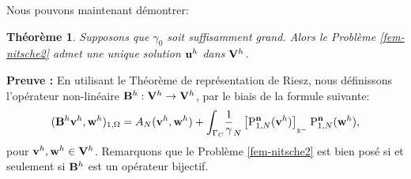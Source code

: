 \documentclass[11pt]{book}
\newtheorem{theorem}{Théorème}[section]
\newcommand{\bt}{\begin{theorem}}
\newcommand{\et}{\end{theorem}}
\newcommand{\pf}{\textbf{Preuve : }}
\def\u{{\bf u}}
\def\n{{\bf n}}
\def\vv{{\bf v}}
\def\w{{\bf w}}
\def\V{{\bf V}}
\def\B{{\bf B}}
\newcommand{\ds}{\displaystyle}
\newcommand{\R}{\mathbb{R}}
\newcommand{\Gc}{\Gamma_{C}}
\newcommand{\dg}{d\Gamma}
\newcommand{\igc}{{\ds\int_{\Gc}\hspace*{-0.7em}}}
\newcommand{\gN}{\gamma_{N}}
\newcommand{\Agh}{A_{N}}
\newcommand{\PNgh}{\mathrm{P}^{\n}_{1, N}}
\newcommand{\pn}[1]{\left [ #1 \right ]_{_{\R^-}}}
\begin{document}
Nous pouvons maintenant démontrer:
\bt
Supposons que $\gamma_0$ soit suffisamment grand. 
Alors le Problème \eqref{fem-nitsche2} admet une unique solution $\u^h$ dans $\V^h$.
\et

\pf
En utilisant le Théorème de représentation de Riesz, nous définissons l'opérateur non-linéaire
$\B^h : \V^h \rightarrow \V^h$, par le biais de la formule suivante:
\[
( \B^h \vv^h , \w^h )_{1,\Omega} =
 \Agh (\vv^h,\w^h)
+ 
\igc \:\:\: \frac1\gN  \pn{\PNgh (\vv^h)} \PNgh (\w^h), %
\] 
pour $\vv^h,\w^h \in \V^h$. %
Remarquons que le Problème \eqref{fem-nitsche2} est bien posé si et seulement si $\B^h$ est un opérateur bijectif.

\medskip
\end{document}
